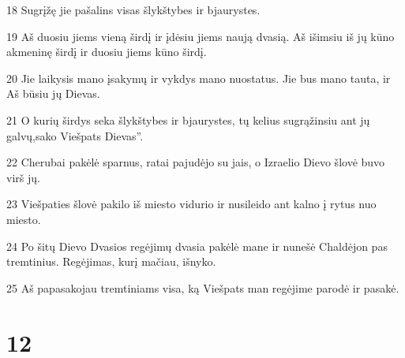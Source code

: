 \par 18 Sugrįžę jie pašalins visas šlykštybes ir bjaurystes. 
\par 19 Aš duosiu jiems vieną širdį ir įdėsiu jiems naują dvasią. Aš išimsiu iš jų kūno akmeninę širdį ir duosiu jiems kūno širdį. 
\par 20 Jie laikysis mano įsakymų ir vykdys mano nuostatus. Jie bus mano tauta, ir Aš būsiu jų Dievas. 
\par 21 O kurių širdys seka šlykštybes ir bjaurystes, tų kelius sugrąžinsiu ant jų galvų,­sako Viešpats Dievas”. 
\par 22 Cherubai pakėlė sparnus, ratai pajudėjo su jais, o Izraelio Dievo šlovė buvo virš jų. 
\par 23 Viešpaties šlovė pakilo iš miesto vidurio ir nusileido ant kalno į rytus nuo miesto. 
\par 24 Po šitų Dievo Dvasios regėjimų dvasia pakėlė mane ir nunešė Chaldėjon pas tremtinius. Regėjimas, kurį mačiau, išnyko. 
\par 25 Aš papasakojau tremtiniams visa, ką Viešpats man regėjime parodė ir pasakė.



\chapter{12}


